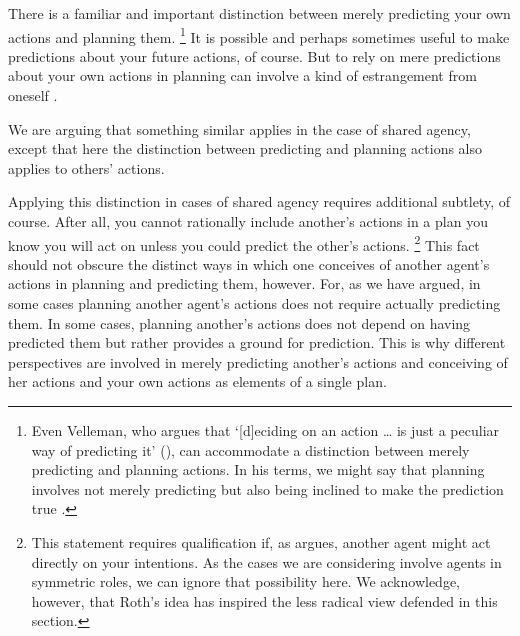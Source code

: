 \documentclass[12pt,\papersize]{extarticle}
\begin{document}
There is a familiar and  important distinction between merely predicting your own actions and planning them.%
%
\footnote{
Even Velleman, who argues that `[d]eciding on an action … is just a peculiar way of predicting it' (\citeyear[p.\ 48]{Velleman:1985mc}), can accommodate a distinction between merely predicting and planning actions.
In his terms, we might say that 
planning involves not merely predicting but also being inclined to make the prediction true \citep[see][p.\ 195]{Velleman:2000fq}.
}
%
It is possible and perhaps sometimes useful to make predictions about your future actions, of course.
But to rely on mere predictions about your own actions in planning can involve a kind of estrangement from oneself \citep[compare][]{Moran:2001hr}.



We are arguing that 
something similar applies in the case of shared agency, 
except that here the distinction between predicting and planning actions also applies to others' actions.


Applying this distinction in cases of shared agency requires additional subtlety, of course.
After all,
you cannot rationally include another's actions in a plan you know you will act on unless you could predict the other's actions.%
%
\footnote{
This statement requires qualification if, as \citet{roth_shared_agency} argues, 
another agent might act directly on your intentions. 
As the cases we are considering involve agents in symmetric roles, we can ignore that possibility here.
We acknowledge, however, that Roth's idea has inspired the less radical view defended in this section.
}
%
This fact should not obscure the distinct ways in which one conceives of another agent's actions in planning and predicting them, however.
For, as we have argued, in some cases planning another agent's actions does not require actually predicting them.
In some cases, planning another's actions does not depend on having predicted them but rather provides a ground for prediction.
This is why 
different perspectives are involved in 
	merely predicting another's actions 
	and 
	conceiving of her actions and  your own actions as elements of a single plan.
	
\end{document}
